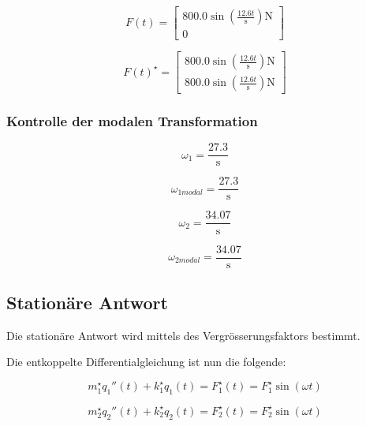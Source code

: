 \documentclass[
  letterpaper,
  DIV=11]{scrreprt}
\begin{document}
\begin{equation*}F(t) = \left[\begin{matrix}800.0 \sin{\left(\frac{12.6 t}{\text{s}} \right)} \text{N}\\0\end{matrix}\right]\end{equation*}

\begin{equation*}F(t)^{\star} = \left[\begin{matrix}800.0 \sin{\left(\frac{12.6 t}{\text{s}} \right)} \text{N}\\800.0 \sin{\left(\frac{12.6 t}{\text{s}} \right)} \text{N}\end{matrix}\right]\end{equation*}

\hypertarget{kontrolle-der-modalen-transformation}{%
\subsubsection{Kontrolle der modalen
Transformation}\label{kontrolle-der-modalen-transformation}}

\begin{equation*}\omega_{1} = \frac{27.3}{\text{s}}\end{equation*}

\begin{equation*}\omega_{1 modal} = \frac{27.3}{\text{s}}\end{equation*}

\begin{equation*}\omega_{2} = \frac{34.07}{\text{s}}\end{equation*}

\begin{equation*}\omega_{2 modal} = \frac{34.07}{\text{s}}\end{equation*}

\hypertarget{stationuxe4re-antwort-2}{%
\subsection{Stationäre Antwort}\label{stationuxe4re-antwort-2}}

Die stationäre Antwort wird mittels des Vergrösserungsfaktors bestimmt.

Die entkoppelte Differentialgleichung ist nun die folgende:

\[m^\star_1 q_1''(t) + k^\star_1 q_1(t) = F^\star_1(t) = F^\star_1 \sin(\omega t)\]

\[m^\star_2 q_2''(t) + k^\star_2 q_2(t) = F^\star_2(t) = F^\star_2 \sin(\omega t)\]
\end{document}
